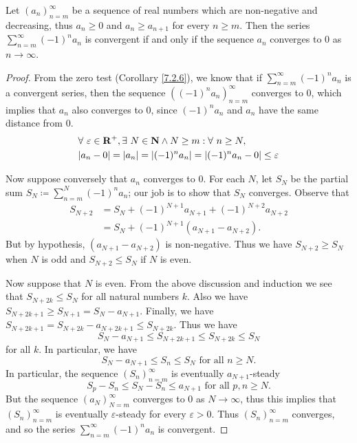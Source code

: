 \begin{proposition}\label{7.2.12}
    Let \((a_n)_{n = m}^\infty\) be a sequence of real numbers which are non-negative and decreasing, thus \(a_n \geq 0\) and \(a_n \geq a_{n + 1}\) for every \(n \geq m\).
    Then the series \(\sum_{n = m}^\infty (-1)^n a_n\) is convergent if and only if the sequence \(a_n\) converges to \(0\) as \(n \to \infty\).
\end{proposition}

\begin{proof}
    From the zero test (Corollary \ref{7.2.6}), we know that if \(\sum_{n = m}^\infty (-1)^n a_n\) is a convergent series, then the sequence \(((-1)^n a_n)_{n = m}^\infty\) converges to \(0\), which implies that \(a_n\) also converges to \(0\), since \((-1)^n a_n\) and \(a_n\) have the same distance from \(0\).
    \begin{align*}
         & \forall\ \varepsilon \in \mathbf{R}^+, \exists\ N \in \mathbf{N} \land N \geq m : \forall\ n \geq N, \\
         & \abs*{a_n - 0} = \abs*{a_n} = \abs*{(-1)^n a_n} = \abs*{(-1)^n a_n - 0} \leq \varepsilon
    \end{align*}

    Now suppose conversely that \(a_n\) converges to \(0\).
    For each \(N\), let \(S_N\) be the partial sum \(S_N \coloneqq \sum_{n = m}^N (-1)^n a_n\);
    our job is to show that \(S_N\) converges.
    Observe that
    \begin{align*}
        S_{N + 2} & = S_N + (-1)^{N + 1} a_{N + 1} + (-1)^{N + 2} a_{N + 2} \\
                  & = S_N + (-1)^{N + 1} (a_{N + 1} - a_{N + 2}).
    \end{align*}
    But by hypothesis, \((a_{N + 1} - a_{N + 2})\) is non-negative.
    Thus we have \(S_{N + 2} \geq S_N\) when \(N\) is odd and \(S_{N + 2} \leq S_N\) if \(N\) is even.

    Now suppose that \(N\) is even.
    From the above discussion and induction we see that \(S_{N + 2k} \leq S_N\) for all natural numbers \(k\).
    Also we have \(S_{N + 2k + 1} \geq S_{N + 1} = S_N - a_{N + 1}\).
    Finally, we have \(S_{N + 2k + 1} = S_{N + 2k} - a_{N + 2k + 1} \leq S_{N + 2k}\).
    Thus we have
    \[
        S_N - a_{N + 1} \leq S_{N + 2k + 1} \leq S_{N + 2k} \leq S_N
    \]
    for all \(k\).
    In particular, we have
    \[
        S_N - a_{N + 1} \leq S_n \leq S_N \text{ for all } n \geq N.
    \]
    In particular, the sequence \((S_n)_{n = m}^\infty\) is eventually \(a_{N + 1}\)-steady
    \[
        S_p - S_n \leq S_N - S_n \leq a_{N + 1} \text{ for all } p, n \geq N.
    \]
    But the sequence \((a_N)_{N = m}^\infty\) converges to \(0\) as \(N \to \infty\), thus this implies that \((S_n)_{n = m}^\infty\) is eventually \(\varepsilon\)-steady for every \(\varepsilon > 0\).
    Thus \((S_n)_{n = m}^\infty\) converges, and so the series \(\sum_{n = m}^\infty (-1)^n a_n\) is convergent.
\end{proof}

